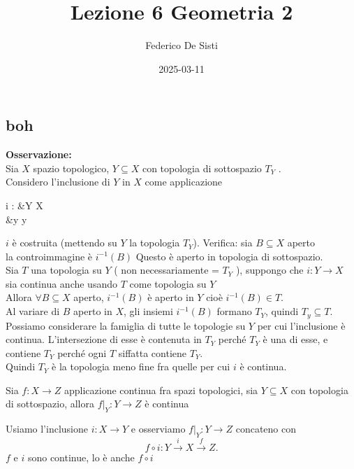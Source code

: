 \documentclass[12px]{article}
\title{Lezione 6 Geometria 2}
\date{2025-03-11}
\author{Federico De Sisti}
\begin{document}
	\maketitle
	\newpage
	\subsection{boh}
	\textbf{Osservazione:}\\
	Sia $X$ spazio topologico, $Y\subseteq X$ con topologia di sottospazio $T_Y$ .\\
	Considero l'inclusione di $Y$ in $X$ come applicazione

	\begin{center}
		\begin{aligned}
			i : &Y \rightarrow X\\
			    &y \rightarrow y
		\end{aligned}
	\end{center}
	$i$ è costruita (mettendo su $Y$ la topologia $T_Y$). Verifica: sia  $B\subseteq X$ aperto\\
	la controimmagine è $i^{-1}(B)$ Questo è aperto in topologia di sottospazio.\\
	Sia  $T$ una topologia su $Y$ ( non necessariamente = $T_Y$ ), suppongo che $i: Y \rightarrow X $ sia continua anche usando $T$ come topologia su $Y$ \\
	Allora $\forall B\subseteq X$ aperto, $i^{-1}(B)$ è aperto in $Y$ cioè $i^{-1}(B)\in T$. \\
	Al variare di $B$ aperto in $X$, gli insiemi $i^{-1}(B)$ formano  $T_Y$, quindi $T_y \subseteq T$.\\
	Possiamo considerare la famiglia di tutte le topologie su  $Y$ per cui l'inclusione è continua. L'intersezione di esse è contenuta in $T_Y$  perché $ T_Y$ è una di esse, e contiene $T_Y$ perché ogni $T$ siffatta contiene $T_Y$. \\
	Quindi $T_Y$ è la topologia meno fine fra quelle per cui $i$ è continua. 
	\begin{prop}
		Sia $f: X \rightarrow Z$ applicazione continua fra spazi topologici, sia $Y\subseteq X$ con topologia di sottospazio, allora $f|_Y:Y \rightarrow Z$ è continua
	\end{prop}
	\begin{dimo}
		Usiamo l'inclusione $i:X \rightarrow Y$ e osserviamo $f|_Y:Y \rightarrow Z$ concateno con\\
		 \[
			 f\circ i: Y \xrightarrow{i} X \xrightarrow{f} Z
		.\] 
		$f$ e $i$ sono continue, lo è anche $f\circ i$
	\end{dimo}
\end{document}
